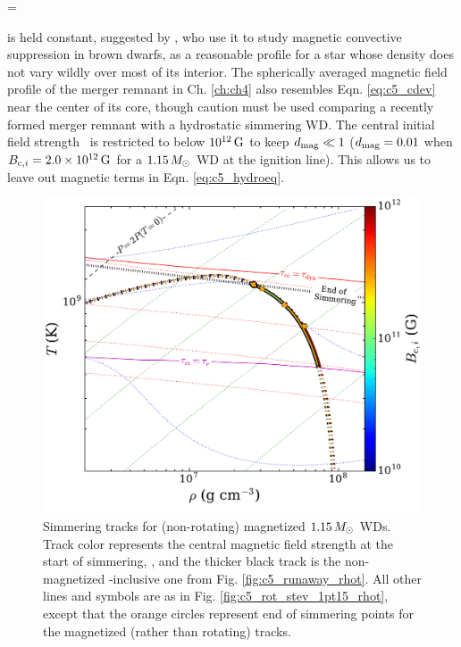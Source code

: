 \eqbegin
\dmag = 
\label{eq:c5_cdev}
\eqend


\noindent is held constant, suggested by \cite{macdm09}, who use it to study magnetic convective suppression in brown dwarfs, as a reasonable profile for a star whose density does not vary wildly over most of its interior.  The spherically averaged magnetic field profile of the merger remnant in Ch. \ref{ch:ch4} also resembles Eqn. \ref{eq:c5_cdev} near the center of its core, though caution must be used comparing a recently formed merger remnant with a hydrostatic simmering WD.  The central initial field strength \Binit\ is restricted to below $10^{12}\,\mathrm{G}$ to keep $\dmag \ll 1$ ($\dmag = 0.01$ when $\Binit = 2.0\times10^{12}\,\mrm{G}$ for a $1.15\,\Msun$ WD at the ignition line).  This allows us to leave out magnetic terms in Eqn. \ref{eq:c5_hydroeq}.


\begin{figure}
\centering
\includegraphics[angle=0,width=0.8\columnwidth]{chapter5_zhu+16/figures/mag_1pt15_rhot.pdf}
\caption{Simmering tracks for (non-rotating) magnetized $1.15\,\Msun$ WDs.  Track color represents the central magnetic field strength at the start of simmering, \Binit, and the thicker black track is the non-magnetized \dnabconv-inclusive one from Fig. \ref{fig:c5_runaway_rhot}.  All other lines and symbols are as in Fig. \ref{fig:c5_rot_stev_1pt15_rhot}, except that the orange circles represent end of simmering points for the magnetized (rather than rotating) tracks.}
\label{fig:c5_mag_1pt15_rhot}
\end{figure}

